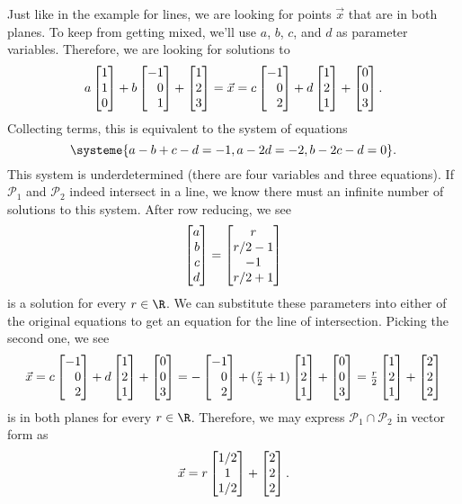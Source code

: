 \begin{example}
	Just like in the example for lines, we are looking for points $\vec x$ that are in both planes. To
	keep from getting mixed, we'll use $a$, $b$, $c$, and $d$ as parameter variables. Therefore, we are looking
	for solutions to
	\[
		a\mat{1\\1\\0}+b\mat{-1\\0\\1}+\mat{1\\2\\3}=\vec x=c\mat{-1\\0\\2}+d\mat{1\\2\\1}+\mat{0\\0\\3}.
	\]
	Collecting terms, this is equivalent to the system of equations
	\[
		\systeme{a-b+c-d=-1,a-2d=-2,b-2c-d=0}.
	\]
	This system is underdetermined (there are four variables and three equations). If $\mathcal P_1$ 
	and $\mathcal P_2$ indeed intersect in a line, we know there must an infinite number
	of solutions to this system. After row reducing, we see
	\[
		\mat{a\\b\\c\\d} = \matc{r\\r/2-1\\-1\\r/2+1}
	\]
	is a solution for every $r\in\R$. We can substitute these parameters into either of the original equations
	to get an equation for the line of intersection. Picking the second one, we see
	\[
		\vec x=c\mat{-1\\0\\2}+d\mat{1\\2\\1}+\mat{0\\0\\3}=-\mat{-1\\0\\2}+(\tfrac{r}{2}+1)\mat{1\\2\\1}+\mat{0\\0\\3}
		=\tfrac{r}{2}\mat{1\\2\\1}+\mat{2\\2\\2}
	\]
	is in both planes for every $r\in \R$. Therefore, we may express $\mathcal P_1\cap \mathcal P_2$ in vector form as
	\[
		\vec x=r\matc{1/2\\1\\1/2}+\mat{2\\2\\2}.
	\]
\end{example}

